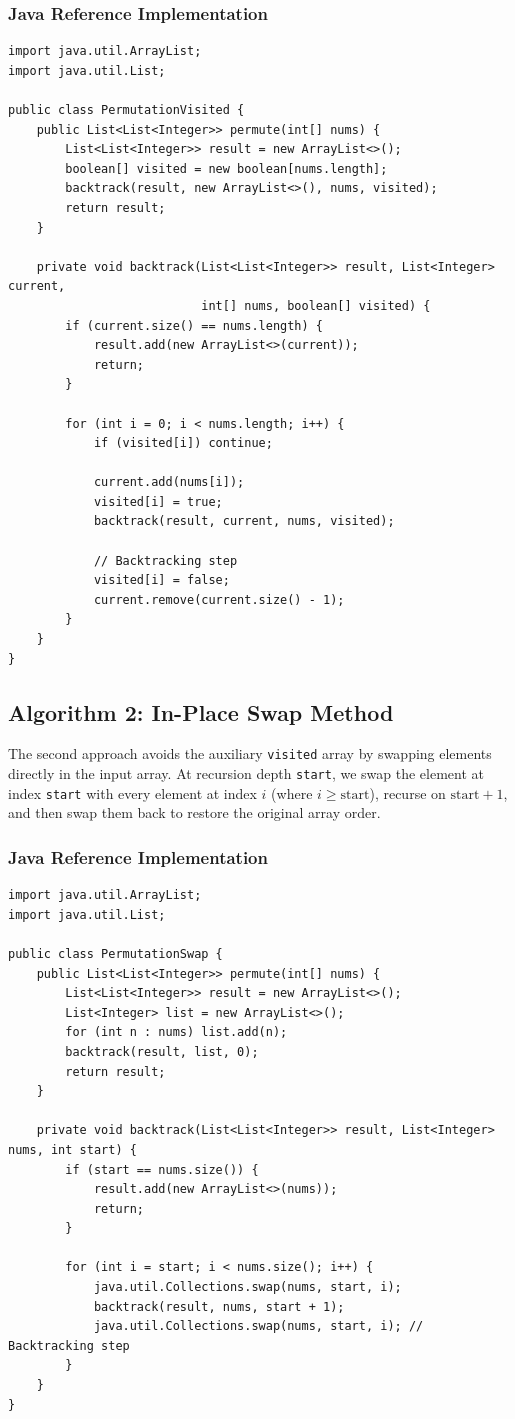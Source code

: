 \documentclass[10pt,journal,compsoc,onecolumn]{IEEEtran}
\begin{document}
\subsubsection{Java Reference Implementation}
\begin{verbatim}
import java.util.ArrayList;
import java.util.List;

public class PermutationVisited {
    public List<List<Integer>> permute(int[] nums) {
        List<List<Integer>> result = new ArrayList<>();
        boolean[] visited = new boolean[nums.length];
        backtrack(result, new ArrayList<>(), nums, visited);
        return result;
    }

    private void backtrack(List<List<Integer>> result, List<Integer> current, 
                           int[] nums, boolean[] visited) {
        if (current.size() == nums.length) {
            result.add(new ArrayList<>(current));
            return;
        }

        for (int i = 0; i < nums.length; i++) {
            if (visited[i]) continue;

            current.add(nums[i]);
            visited[i] = true;
            backtrack(result, current, nums, visited);
            
            // Backtracking step
            visited[i] = false;
            current.remove(current.size() - 1);
        }
    }
}
\end{verbatim}

\subsection{Algorithm 2: In-Place Swap Method}
The second approach avoids the auxiliary \texttt{visited} array by swapping elements directly in the input array. At recursion depth \texttt{start}, we swap the element at index \texttt{start} with every element at index $i$ (where $i \ge \text{start}$), recurse on $\text{start}+1$, and then swap them back to restore the original array order.

\subsubsection{Java Reference Implementation}
\begin{verbatim}
import java.util.ArrayList;
import java.util.List;

public class PermutationSwap {
    public List<List<Integer>> permute(int[] nums) {
        List<List<Integer>> result = new ArrayList<>();
        List<Integer> list = new ArrayList<>();
        for (int n : nums) list.add(n);
        backtrack(result, list, 0);
        return result;
    }

    private void backtrack(List<List<Integer>> result, List<Integer> nums, int start) {
        if (start == nums.size()) {
            result.add(new ArrayList<>(nums));
            return;
        }

        for (int i = start; i < nums.size(); i++) {
            java.util.Collections.swap(nums, start, i);
            backtrack(result, nums, start + 1);
            java.util.Collections.swap(nums, start, i); // Backtracking step
        }
    }
}
\end{verbatim}
\end{document}
